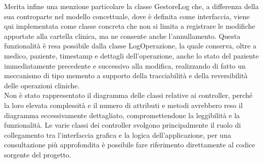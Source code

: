 Merita infine una menzione particolare la classe GestoreLog che, a differenza della sua controparte nel modello concettuale, dove è definita come interfaccia, viene qui implementata come classe concreta che non si limita a registrare le modifiche apportate alla cartella clinica, ma ne consente anche l'annullamento. Questa funzionalità è resa possibile dalla classe LogOperazione, la quale conserva, oltre a medico, paziente, timestamp e dettagli dell'operazione, anche lo stato del paziente immediatamente precedente e successivo alla modifica, realizzando di fatto un meccanismo di tipo memento a supporto della tracciabilità e della reversibilità delle operazioni cliniche.\\

Non è stato rappresentato il diagramma delle classi relative ai controller, perché la loro elevata complessità e il numero di attributi e metodi avrebbero reso il diagramma eccessivamente dettagliato, compromettendone la leggibilità e la funzionalità. Le varie classi dei controller svolgono principalmente il ruolo di collegamento tra l'interfaccia grafica e la logica dell'applicazione, per una consultazione più approfondita è possibile fare riferimento direttamente al codice sorgente del progetto.
